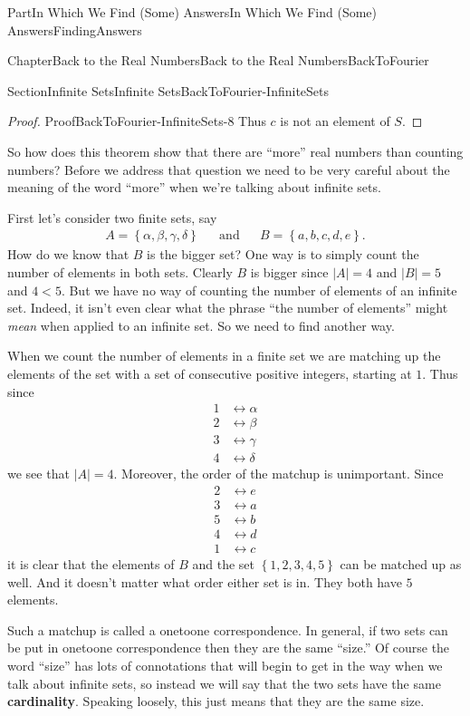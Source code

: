 \documentclass[oneside,10pt,]{book}
\newcommand{\terminology}[1]{\textbf{#1}}
\numberwithin{equation}{part}
\newcommand{\abs}[1]{\left|#1\right|}
\newcommand{\lt}{<}
\newcommand{\amp}{&}
\begin{document}
\begin{partptx}{Part}{In Which We Find (Some) Answers}{}{In Which We Find (Some) Answers}{}{}{FindingAnswers}
\begin{chapterptx}{Chapter}{Back to the Real Numbers}{}{Back to the Real Numbers}{}{}{BackToFourier}
\begin{sectionptx}{Section}{Infinite Sets}{}{Infinite Sets}{}{}{BackToFourier-InfiniteSets}
\begin{proof}{Proof}{}{BackToFourier-InfiniteSets-8}
Thus \(c\) is not an element of \(S\).%
\end{proof}
So how does this theorem show that there are ``more'' real numbers than counting numbers?  Before we address that question we need to be very careful about the meaning of the word ``more'' when we're talking about infinite sets.%
\par
First let's consider two finite sets, say%
\begin{align*}
A=\left\{\alpha,\beta,\gamma,\delta\right\}
\amp{}\amp{}\text{and}\amp{}\amp{}B=\left\{a,b,c,d,e\right\}.
\end{align*}
How do we know that \(B\) is the bigger set? One way is to simply count the number of elements in both sets. Clearly \(B\) is  bigger since \(\abs{A}=4\) and \(\abs{B}=5\) and \(4\lt 5\).  But we have no way of counting the number of elements of an infinite set.  Indeed, it isn't even clear what the phrase ``the number of elements'' might \emph{mean} when applied to  an infinite set. So we need to find another way.%
\par
When we count the number of elements in a finite set  we are matching up the elements of the set with a set of consecutive positive integers, starting at \(1\).  Thus since%
\begin{align*}
1\amp \leftrightarrow\alpha\\
2\amp \leftrightarrow\beta\\
3\amp \leftrightarrow\gamma\\
4\amp \leftrightarrow\delta
\end{align*}
we see that \(\abs{A}=4\).  Moreover, the order of the match\textendash{}up is unimportant.   Since%
\begin{align*}
2\amp \leftrightarrow e\\
3\amp \leftrightarrow a\\
5\amp \leftrightarrow b\\
4\amp \leftrightarrow d\\
1\amp \leftrightarrow c
\end{align*}
it is clear that the elements of \(B\) and the set \(\left\{1,2,3,4,5\right\}\) can be matched up as well.  And it doesn't matter what order either set is in.  They both have \(5\) elements.%
\par
{} Such a match\textendash{}up is called a one\textendash{}to\textendash{}one correspondence.  In general, if two sets can be put in one\textendash{}to\textendash{}one correspondence then they are the same ``size.'' Of course the word ``size'' has lots of connotations that will begin to get in the way when we talk about infinite sets, so instead we will say that the two sets have the same \terminology{cardinality}. Speaking loosely, this just means that they are the same size.%

\end{sectionptx}
\end{chapterptx}
\end{partptx}
\end{document}
